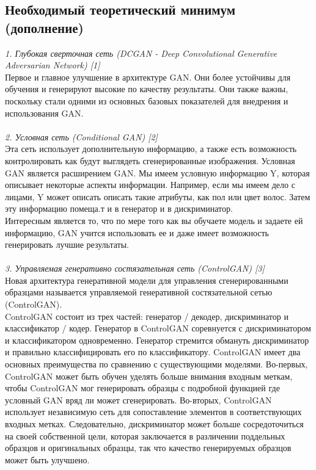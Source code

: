 \documentclass{article}
\begin{document}
    
    \newpage
    \begin{center} 
    \section{Необходимый теоретический минимум (дополнение)}
    \end{center} 
    \large 
    \textit{1. Глубокая сверточная сеть (DCGAN - Deep Convolutional Generative Adversarian Network) [1]}
    \\
    Первое и главное улучшение в архитектуре GAN. Они более устойчивы для обучения и генерируют высокие по качеству результаты. Они также важны, поскольку стали одними из основных базовых показателей для внедрения и использования GAN. 
    \\ \\
    \textit{2. Условная сеть (Conditional GAN) [2]}
    \\
    Эта сеть использует дополнительную информацию, а также есть возможность контролировать как будут выглядеть сгенерированные изображения. Условная GAN является расширением GAN. Мы имеем условную информацию Y, которая описывает некоторые аспекты информации. Например, если мы имеем дело с лицами, Y может описать описать такие атрибуты, как пол или цвет волос. Затем эту информацию помеща.т и в генератор и в дискриминатор. \\
    Интересным является то, что по мере того как вы обучаете модель и задаете ей информацию, GAN учится использовать ее и даже имеет возможность генерировать лучшие результаты.
    \\ \\
    \textit{3. Управляемая генеративно состязательная сеть (ControlGAN) [3]}
    \\
    Новая архитектура генеративной модели для управления сгенерированными образцами называется управляемой генеративной состязательной сетью (ControlGAN). 
    \\
    ControlGAN состоит из трех частей: генератор / декодер, дискриминатор и классификатор / кодер. Генератор в ControlGAN соревнуется с дискриминатором и классификатором одновременно.
    Генератор стремится обмануть дискриминатор и правильно классифицировать его по классификатору. ControlGAN имеет два основных преимущества по сравнению с существующими моделями. 
    Во-первых, ControlGAN может быть обучен уделять больше внимания входным меткам, чтобы ControlGAN мог генерировать образцы с подробной функцией где условный GAN вряд ли может сгенерировать. Во-вторых, ControlGAN использует независимую сеть для сопоставление элементов в соответствующих входных метках. Следовательно, дискриминатор может больше сосредоточиться на своей собственной цели, которая заключается в различении поддельных образцов и оригинальных образцы, так что качество генерируемых образцов может быть улучшено.
\end{document}
